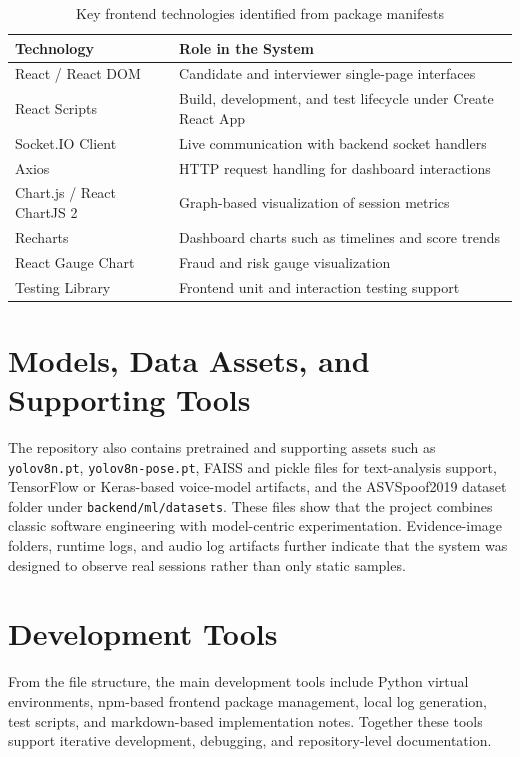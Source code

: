 \documentclass[12pt,a4paper]{extreport}
\begin{document}
\begin{table}[H]
\centering
\caption{Key frontend technologies identified from package manifests}
\begin{tabularx}{\textwidth}{p{3.4cm}X}
\toprule
\textbf{Technology} & \textbf{Role in the System}\\
\midrule
React / React DOM & Candidate and interviewer single-page interfaces\\
React Scripts & Build, development, and test lifecycle under Create React App\\
Socket.IO Client & Live communication with backend socket handlers\\
Axios & HTTP request handling for dashboard interactions\\
Chart.js / React ChartJS 2 & Graph-based visualization of session metrics\\
Recharts & Dashboard charts such as timelines and score trends\\
React Gauge Chart & Fraud and risk gauge visualization\\
Testing Library & Frontend unit and interaction testing support\\
\bottomrule
\end{tabularx}
\end{table}

\section{Models, Data Assets, and Supporting Tools}
The repository also contains pretrained and supporting assets such as \texttt{yolov8n.pt}, \texttt{yolov8n-pose.pt}, FAISS and pickle files for text-analysis support, TensorFlow or Keras-based voice-model artifacts, and the ASVSpoof2019 dataset folder under \texttt{backend/ml/datasets}. These files show that the project combines classic software engineering with model-centric experimentation. Evidence-image folders, runtime logs, and audio log artifacts further indicate that the system was designed to observe real sessions rather than only static samples.

\section{Development Tools}
From the file structure, the main development tools include Python virtual environments, npm-based frontend package management, local log generation, test scripts, and markdown-based implementation notes. Together these tools support iterative development, debugging, and repository-level documentation.
\end{document}
